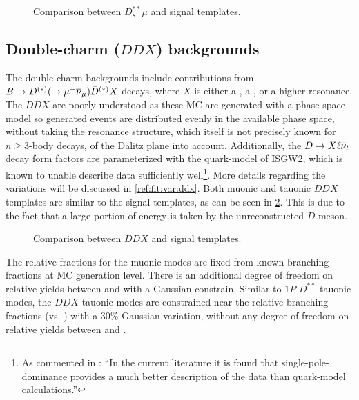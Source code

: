 \begin{figure}[!htb]

    \caption{Comparison between $D_s^{**}\mu$ and \Dz\taum signal templates.}
    \label{fig:d_s-vs-d0-sig}
\end{figure}


\subsection{Double-charm ($DDX$) backgrounds}
\label{ref:fit:tmpl:ddx}

The double-charm backgrounds include contributions from
$B \rightarrow D^{(*)}(\rightarrow {\ensuremath{\mu^-}}{\ensuremath{{\overline{\nu}}_\mu}})\bar{D}^{(*)} X$ decays, where $X$
is either a \kaon, a \Kstar, or a higher \Kstar resonance.
The $DDX$ are poorly understood as these MC are generated with
a phase space model so generated events are distributed evenly in the available
phase space, without taking the resonance structure,
which itself is not precisely known for $n \geq 3$-body decays,
of the Dalitz plane into account.
Additionally, the $D \rightarrow X \ell{\ensuremath{{\overline{\nu}}_l}}$ decay form factors are
parameterized with the quark-model of ISGW2,
which is known to unable describe data sufficiently well\footnote{
    As commented in \cite{LHCb-ANA-2020-056}:
    ``In the current literature it is found that single-pole-dominance provides
    a much better description of the data than quark-model calculations.''
}.
More details regarding the variations will be discussed in
\cref{ref:fit:var:ddx}.
Both muonic and tauonic $DDX$ templates are similar to the signal templates,
as can be seen in \cref{fig:ddx-vs-d0-sig}.
This is due to the fact that a large portion of energy is taken by the
unreconstructed $D$ meson.

\begin{figure}[!htb]

    \caption{Comparison between $DDX$ and \Dz\taum signal templates.}
    \label{fig:ddx-vs-d0-sig}
\end{figure}


The relative fractions for the muonic modes are fixed from known branching
fractions at MC generation level.
There is an additional degree of freedom on relative yields between \Bm and \Bzb
with a Gaussian constrain.
Similar to $1P$ $D^{**}$ tauonic modes,
the $DDX$ tauonic modes are constrained near the relative branching fractions
(\tauon vs. \muon) with a 30\% Gaussian variation,
without any degree of freedom on relative yields between \Bm and \Bzb.



